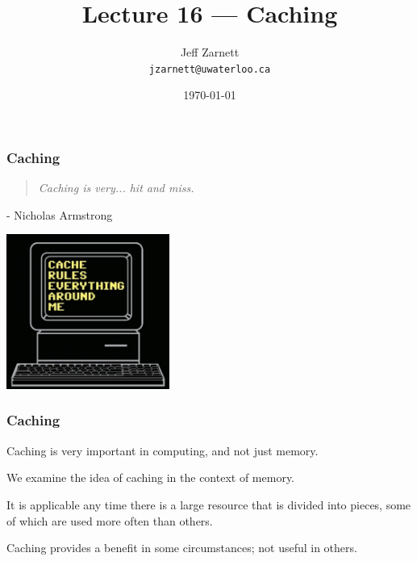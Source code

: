 

\title{Lecture 16 --- Caching }

\author{Jeff Zarnett \\ \small \texttt{jzarnett@uwaterloo.ca}}
\date{\today}




\begin{frame}
  \titlepage

 \end{frame}

\begin{frame}
\frametitle{Caching}

\vspace{5em}

\begin{quote}
\textit{Caching is very... hit and miss.}
\end{quote}
\hfill - Nicholas Armstrong

\begin{center}
	\includegraphics[width=0.4\textwidth]{images/cacherules.jpg}
\end{center}

\end{frame}

\begin{frame}
\frametitle{Caching}

Caching is very important in computing, and not just memory. 

We examine the idea of caching in the context of memory.

It is applicable any time there is a large resource that is divided into pieces, some of which are used more often than others. 

Caching provides a benefit in some circumstances; not useful in others. 


\end{frame}

